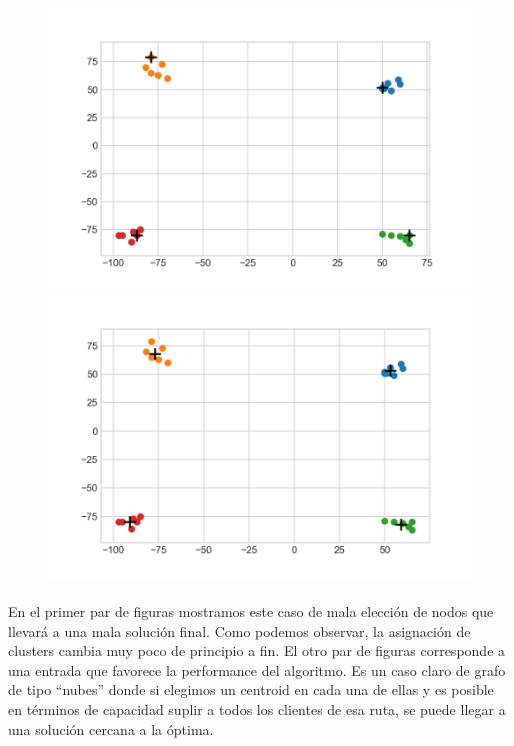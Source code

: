 \begin{figure}[H]
	\centering
	\begin{minipage}{0.35\textwidth}
		\centering
		\includegraphics[width=1\textwidth]{images/kmeans/buenonube0}
	\end{minipage}%
	\hspace{0.03\textwidth}
	\begin{minipage}{0.35\textwidth}
		\centering
		\includegraphics[width=1\textwidth]{images/kmeans/buenonube2}
	\end{minipage}%
\end{figure}
\paragraph{}
En el primer par de figuras mostramos este caso de mala elección de nodos que llevará a una mala solución final. Como podemos observar, la asignación de clusters cambia muy poco de principio a fin. El otro par de figuras corresponde a una entrada que favorece la performance del algoritmo. Es un caso claro de grafo de tipo ``nubes'' donde si elegimos un centroid en cada una de ellas y es posible en términos de capacidad suplir a todos los clientes de esa ruta, se puede llegar a una solución cercana a la óptima.

